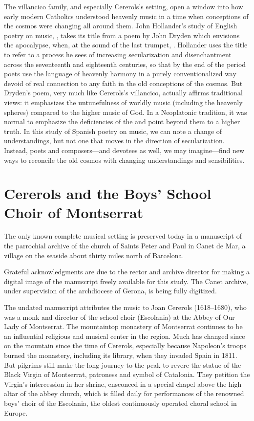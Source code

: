The villancico family, and especially Cererols's setting, open a window into how
early modern Catholics understood heavenly music in a time when conceptions of
the cosmos were changing all around them.
John Hollander's study of English poetry on music, , takes its title from a poem by John Dryden which envisions the apocalypse,
when, at the sound of the last trumpet, .
Hollander uses the title to refer to a process he sees of increasing
secularization and disenchantment across the seventeenth and eighteenth
centuries, so that by the end of the period poets use the language of heavenly
harmony in a purely conventionalized way devoid of real connection to any faith
in the old conceptions of the cosmos.
But Dryden's poem, very much like Cererols's villancico, actually affirms
traditional views: it emphasizes the untunefulness of worldly music (including
the heavenly spheres) compared to the higher music of God.
In a Neoplatonic tradition, it was normal to emphasize the deficiencies of the
 and point beyond them to a higher truth.
In this study of Spanish poetry on music, we can note a change of
understandings, but not one that moves in the direction of secularization.
Instead, poets and composers---and devotees as well, we may imagine---find new
ways to reconcile the old cosmos with changing understandings and sensibilities.

\section{Cererols and the Boys' School Choir of Montserrat}

The only known complete musical setting is preserved today in a manuscript of
the parrochial archive of the church of Saints Peter and Paul in Canet de Mar, a
village on the seaside about thirty miles north of Barcelona.%
\begin{Footnote}
    Grateful acknowledgments are due to the rector and archive director for
    making a digital image of the manuscript freely available for this study.
    The Canet archive, under supervision of the archdiocese of Gerona, is being
    fully digitized.
\end{Footnote}
The undated manuscript attributes the music to Joan Cererols (1618--1680), who
was a monk and director of the school choir (Escolania) at the Abbey of Our Lady
of Montserrat.
The mountaintop monastery of Montserrat continues to be an influential
religious and musical center in the region. 
Much has changed since on the mountain since the time of Cererols, especially
because Napoleon's troops burned the monastery, including its library, when they
invaded Spain in 1811.
But pilgrims still make the long journey to the peak to revere the statue of the
Black Virgin of Montserrat, patroness and symbol of Catalonia.
They petition the Virgin's intercession in her shrine, ensconced in a special
chapel above the high altar of the abbey church, which is filled daily for
performances of the renowned boys' choir of the Escolania, the oldest
continuously operated choral school in Europe.

